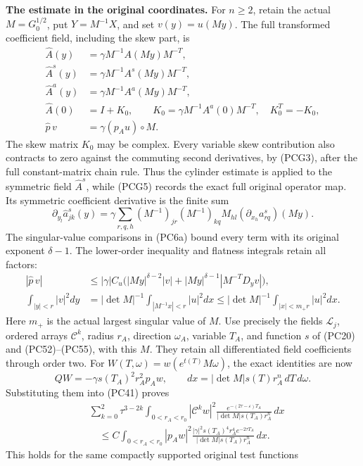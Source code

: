\documentclass[
  11pt,
]{article}
\begin{document}
\textbf{The estimate in the original coordinates.} For \(n\geq2\),
retain the actual \(M=G_0^{1/2}\), put \(Y=M^{-1}X\), and set
\(v(y)=u(My)\). The full transformed coefficient field, including the
skew part, is \[
 \begin{split}
 \widehat A(y)&=\gamma M^{-1}A(My)M^{-T},\\
 \widehat A^s(y)&=\gamma M^{-1}A^s(My)M^{-T},\\
 \widehat A^a(y)&=\gamma M^{-1}A^a(My)M^{-T},\\
 \widehat A(0)&=I+K_0,\qquad
 K_0=\gamma M^{-1}A^a(0)M^{-T},\quad K_0^T=-K_0,\\
 \widehat p\,v&=\gamma(p_Au)\circ M.
 \end{split}                                                    \tag{PCG5}
\] The skew matrix \(K_0\) may be complex. Every variable skew
contribution also contracts to zero against the commuting second
derivatives, by (PCG3), after the full constant-matrix chain rule. Thus
the cylinder estimate is applied to the symmetric field
\(\widehat A^s\), while (PCG5) records the exact full original operator
map. Its symmetric coefficient derivative is the finite sum \[
 \partial_{y_l}\widehat a^s_{jk}(y)
 =\gamma\sum_{r,q,h}(M^{-1})_{jr}(M^{-1})_{kq}M_{hl}
                         (\partial_{x_h}a^s_{rq})(My).
 \tag{PCG6}
\] The singular-value comparisons in (PC6a) bound every term with its
original exponent \(\delta-1\). The lower-order inequality and flatness
integrals retain all factors: \[
 \begin{split}
 |\widehat p\,v|&\leq|\gamma|C_u
       \bigl(|My|^{\delta-2}|v|
       +|My|^{\delta-1}|M^{-T}D_yv|\bigr),\\
 \int_{|y|<r}|v|^2dy
 &=|\det M|^{-1}\int_{|M^{-1}x|<r}|u|^2dx
 \leq|\det M|^{-1}\int_{|x|<m_+r}|u|^2dx.
 \end{split}                                                    \tag{PCG7}
\] Here \(m_+\) is the actual largest singular value of \(M\). Use
precisely the fields \(\mathcal L_j\), ordered arrays \(\mathcal C^k\),
radius \(r_A\), direction \(\omega_A\), variable \(T_A\), and function
\(s\) of (PC20) and (PC52)--(PC55), with this \(M\). They retain all
differentiated field coefficients through order two. For
\(W(T,\omega)=w(e^{t(T)}M\omega)\), the exact identities are now \[
 QW=-\gamma s(T_A)^2r_A^2p_Aw,\qquad
 dx=|\det M|s(T)r_A^n\,dT\,d\omega.
 \tag{PCG8}
\] Substituting them into (PC41) proves \[
 \begin{split}
 &\sum_{k=0}^2\tau^{3-2k}\int_{0<r_A<r_0}
 |\mathcal C^kw|^2
 \frac{e^{-(2\tau-\varepsilon)T_A}}
 {|\det M|s(T_A)r_A^n}\,dx\\
 &\quad\leq C\int_{0<r_A<r_0}|p_Aw|^2
 \frac{|\gamma|^2s(T_A)^4r_A^4e^{-2\tau T_A}}
 {|\det M|s(T_A)r_A^n}\,dx.
 \end{split}                                                    \tag{PCG9}
\] This holds for the same compactly supported original test functions
\end{document}
